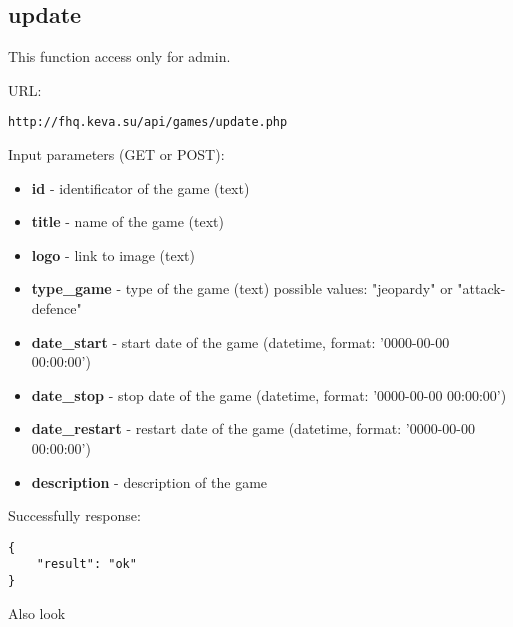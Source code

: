 \subsection{update}
\par

This function access only for admin.

URL:
\begin{Verbatim}[frame=single]
http://fhq.keva.su/api/games/update.php
\end{Verbatim}

Input parameters (GET or POST):
\begin{itemize}
  \item \textbf{id} - identificator of the game (text)
  \item \textbf{title} - name of the game (text)
  \item \textbf{logo} - link to image (text)
  \item \textbf{type_game} - type of the game (text) possible values: "jeopardy" or "attack-defence"
  \item \textbf{date_start} - start date of the game (datetime, format:  '0000-00-00 00:00:00')
  \item \textbf{date_stop} - stop date of the game (datetime, format:  '0000-00-00 00:00:00')
  \item \textbf{date_restart} - restart date of the game (datetime, format:  '0000-00-00 00:00:00')
  \item \textbf{description} - description of the game
\end{itemize}

Successfully response:  \\
\begin{Verbatim}[frame=single]
{
    "result": "ok"
}
\end{Verbatim}

Also look ~